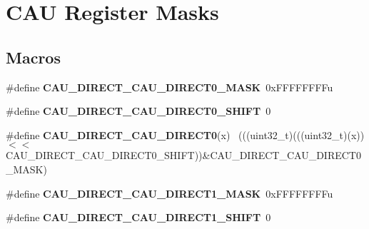 \hypertarget{group___c_a_u___register___masks}{}\section{C\+A\+U Register Masks}
\label{group___c_a_u___register___masks}
\subsection*{Macros}
\begin{DoxyCompactItemize}
\item 
\hypertarget{group___c_a_u___register___masks_ga44f4bea009f3e9943e310dbbed98f7a3}{}\#define {\bfseries C\+A\+U\+\_\+\+D\+I\+R\+E\+C\+T\+\_\+\+C\+A\+U\+\_\+\+D\+I\+R\+E\+C\+T0\+\_\+\+M\+A\+S\+K}~0x\+F\+F\+F\+F\+F\+F\+F\+Fu\label{group___c_a_u___register___masks_ga44f4bea009f3e9943e310dbbed98f7a3}

\item 
\hypertarget{group___c_a_u___register___masks_ga53178110db052d34395df9ad7e9afd0e}{}\#define {\bfseries C\+A\+U\+\_\+\+D\+I\+R\+E\+C\+T\+\_\+\+C\+A\+U\+\_\+\+D\+I\+R\+E\+C\+T0\+\_\+\+S\+H\+I\+F\+T}~0\label{group___c_a_u___register___masks_ga53178110db052d34395df9ad7e9afd0e}

\item 
\hypertarget{group___c_a_u___register___masks_ga4ee405a84bbe23aa11e9cd757d1f9364}{}\#define {\bfseries C\+A\+U\+\_\+\+D\+I\+R\+E\+C\+T\+\_\+\+C\+A\+U\+\_\+\+D\+I\+R\+E\+C\+T0}(x)                            ~(((uint32\+\_\+t)(((uint32\+\_\+t)(x))$<$$<$C\+A\+U\+\_\+\+D\+I\+R\+E\+C\+T\+\_\+\+C\+A\+U\+\_\+\+D\+I\+R\+E\+C\+T0\+\_\+\+S\+H\+I\+F\+T))\&C\+A\+U\+\_\+\+D\+I\+R\+E\+C\+T\+\_\+\+C\+A\+U\+\_\+\+D\+I\+R\+E\+C\+T0\+\_\+\+M\+A\+S\+K)\label{group___c_a_u___register___masks_ga4ee405a84bbe23aa11e9cd757d1f9364}

\item 
\hypertarget{group___c_a_u___register___masks_ga201696a74ac7fd3db77cd19d3d2110cf}{}\#define {\bfseries C\+A\+U\+\_\+\+D\+I\+R\+E\+C\+T\+\_\+\+C\+A\+U\+\_\+\+D\+I\+R\+E\+C\+T1\+\_\+\+M\+A\+S\+K}~0x\+F\+F\+F\+F\+F\+F\+F\+Fu\label{group___c_a_u___register___masks_ga201696a74ac7fd3db77cd19d3d2110cf}

\item 
\hypertarget{group___c_a_u___register___masks_ga99cc153a4a7217feeea9ccc898a38d98}{}\#define {\bfseries C\+A\+U\+\_\+\+D\+I\+R\+E\+C\+T\+\_\+\+C\+A\+U\+\_\+\+D\+I\+R\+E\+C\+T1\+\_\+\+S\+H\+I\+F\+T}~0\label{group___c_a_u___register___masks_ga99cc153a4a7217feeea9ccc898a38d98}


\end{DoxyCompactItemize}
